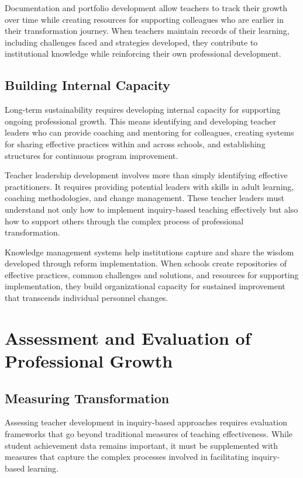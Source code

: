 \documentclass[
  Letterpaper,
]{scrbook}
\begin{document}
Documentation and portfolio development allow teachers to track their
growth over time while creating resources for supporting colleagues who
are earlier in their transformation journey. When teachers maintain
records of their learning, including challenges faced and strategies
developed, they contribute to institutional knowledge while reinforcing
their own professional development.

\subsection{Building Internal
Capacity}\label{building-internal-capacity}

Long-term sustainability requires developing internal capacity for
supporting ongoing professional growth. This means identifying and
developing teacher leaders who can provide coaching and mentoring for
colleagues, creating systems for sharing effective practices within and
across schools, and establishing structures for continuous program
improvement.

Teacher leadership development involves more than simply identifying
effective practitioners. It requires providing potential leaders with
skills in adult learning, coaching methodologies, and change management.
These teacher leaders must understand not only how to implement
inquiry-based teaching effectively but also how to support others
through the complex process of professional transformation.

Knowledge management systems help institutions capture and share the
wisdom developed through reform implementation. When schools create
repositories of effective practices, common challenges and solutions,
and resources for supporting implementation, they build organizational
capacity for sustained improvement that transcends individual personnel
changes.

\section{Assessment and Evaluation of Professional
Growth}\label{assessment-and-evaluation-of-professional-growth}

\subsection{Measuring Transformation}\label{measuring-transformation}

Assessing teacher development in inquiry-based approaches requires
evaluation frameworks that go beyond traditional measures of teaching
effectiveness. While student achievement data remains important, it must
be supplemented with measures that capture the complex processes
involved in facilitating inquiry-based learning.
\end{document}
